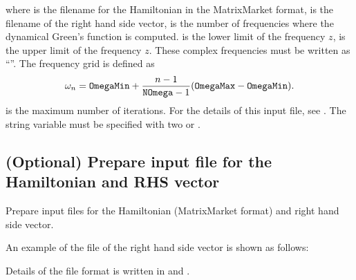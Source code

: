 \documentclass[letterpaper,10pt,dvipdfmx,openany,english]{sphinxmanual}
\begin{document}
where  is the file\sphinxhyphen{}name for the Hamiltonian in the MatrixMarket format,
 is the file\sphinxhyphen{}name of the right hand side vector,
 is the number of frequencies where the dynamical Green’s function
is computed.
 is the lower limit of the frequency \(z\),
 is the upper limit of the frequency \(z\).
These complex frequencies must be written as “”.
The frequency grid is defined as
\begin{equation*}
\begin{split}\begin{align}
\omega_n =  {\tt OmegaMin}
+ \frac{n-1}{{\tt NOmega}-1}({\tt OmegaMax} - {\tt OmegaMin}).
\end{align}\end{split}
\end{equation*}
 is the maximum number of iterations.
For the details of this input file, see {\hyperref[\detokenize{shiftk_format_en:modpara}]{}}.
The string variable must be specified with two \sphinxcode{\sphinxupquote{\textquotesingle{}}} or .


\subsection{(Optional) Prepare input file for the Hamiltonian and RHS vector}
\label{\detokenize{shiftk_flow_en:optional-prepare-input-file-for-the-hamiltonian-and-rhs-vector}}
Prepare input files for the Hamiltonian (MatrixMarket format)
and right hand side vector.

An example of the file of the right hand side vector
is shown as follows:

\begin{sphinxVerbatim}[commandchars=\\\{\}]
    
    
     
 
\end{sphinxVerbatim}

Details of the file format is written in
{\hyperref[\detokenize{shiftk_format_en:ham}]{}} and {\hyperref[\detokenize{shiftk_format_en:vec}]{}}.
\end{document}

